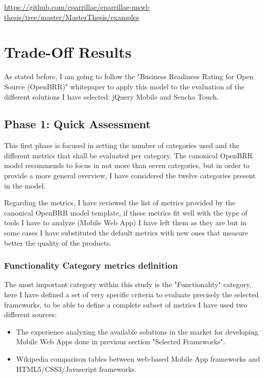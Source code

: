 \documentclass[a4paper,12pt]{book}
\begin{document}
\url{https://github.com/eparrillae/eparrillae-mswl-thesis/tree/master/MasterThesis/examples}



\chapter{Trade-Off Results}
\label{chap:results}

As stated before, I am going to follow the "Business Readiness Rating for Open Source
(OpenBRR)" whitepaper\cite{OpenBRRWhitepaper} to apply this model to the evaluation of the different solutions I have selected: jQuery Mobile and Sencha Touch.

\section{Phase 1: Quick Assessment}
\label{sec:phase1}
This first phase is focused in setting the number of categories used and the different metrics that shall be evaluated per category. The canonical OpenBRR model recommends to focus in not more than seven categories, but in order to provide a more general overview, I have considered the twelve categories present in the model.

Regarding the metrics, I have reviewed the list of metrics provided by the canonical OpenBRR model template, if these metrics fit well with the type of tools I have to analyze (Mobile Web App) I have left them as they are but in some cases I have substituted the default metrics with new ones that measure better the quality of the products.

\subsection{Functionality Category metrics definition}
\label{Functionality Category metrics definition}

The most important category within this study is the "Functionality" category, here I have defined a set of very specific criteria to evaluate precisely the selected frameworks, to be able to define a complete subset of metrics I have used two different sources:

\begin{itemize}
 \item The experience analyzing the available solutions in the market for developing Mobile Web Apps done in previous section "Selected Frameworks".
 \item Wikipedia comparison tables between web-based Mobile App frameworks\cite{wikipedia1}  and HTML5/CSS3/Javascript frameworks\cite{wikipedia2}.
\end{itemize}
\end{document}
